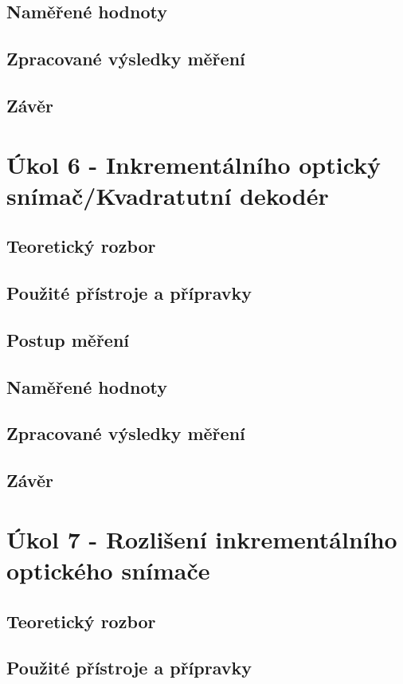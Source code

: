 \documentclass{protokol}
\begin{document}
    \subsection{Naměřené hodnoty}
    \subsection{Zpracované výsledky měření}
    \subsection{Závěr}

\pagebreak


\section{Úkol 6 - Inkrementálního optický snímač/Kvadratutní dekodér}
    \subsection{Teoretický rozbor}
    \subsection{Použité přístroje a přípravky}
    \subsection{Postup měření}
    \subsection{Naměřené hodnoty}
    \subsection{Zpracované výsledky měření}
    \subsection{Závěr}

\pagebreak


\section{Úkol 7 - Rozlišení inkrementálního optického snímače}
    \subsection{Teoretický rozbor}
    \subsection{Použité přístroje a přípravky}
\end{document}

